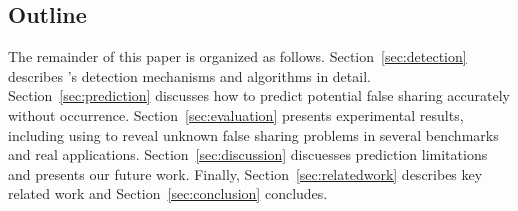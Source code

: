 \begin{itemize}

\end{itemize}

\subsection*{Outline}

The remainder of this paper is organized as follows. 
Section~\ref{sec:detection} describes \Predator{}'s detection mechanisms and
algorithms in detail.
Section~\ref{sec:prediction} discusses how to predict potential false sharing accurately 
without occurrence. 
Section~\ref{sec:evaluation} presents experimental results, including using \Predator{} to 
reveal unknown false sharing problems in several benchmarks and real applications. 
Section~\ref{sec:discussion} discuesses prediction limitations and presents our future work.
Finally, 
Section~\ref{sec:relatedwork} describes key related work and Section~\ref{sec:conclusion} concludes.



